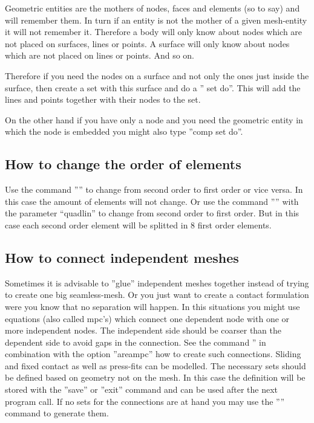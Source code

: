 \documentclass{article}
\begin{document}
\begin{appendix}
Geometric entities are the mothers of nodes, faces and elements (so to say) and will remember them. In turn if an entity is not the mother of a given mesh-entity it will not remember it. Therefore a body will only know about nodes which are not placed on surfaces, lines or points. A surface will only know about nodes which are not placed on lines or points. And so on.

Therefore if you need the nodes on a surface and not only the ones just inside the surface, then create a set with this surface and do a '' set do''. This will add the lines and points together with their nodes to the set.

On the other hand if you have only a node and you need the geometric entity in which the node is embedded you might also type ''comp set do''.


\subsection{\label{How to change the order of elements}How to change the order of elements}
Use the command '''' to change from second order to first order or vice versa. In this case the amount of elements will not change. Or use the command '''' with the parameter ``quadlin'' to change from second order to first order. But in this case each second order element will be splitted in 8 first order elements. 


\subsection{\label{How to connect independent meshes}How to connect independent meshes}
Sometimes it is advisable to ''glue'' independent meshes together instead of trying to create one big seamless-mesh. Or you just want to create a contact formulation were you know that no separation will happen. In this situations you might use equations (also called mpc's) which connect one dependent node with one or more independent nodes. The independent side should be coarser than the dependent side to avoid gaps in the connection. See the command '' in combination with the option ''areampc'' how to create such connections. Sliding and fixed contact as well as press-fits can be modelled. The necessary sets should be defined based on geometry not on the mesh. In this case the definition will be stored with the ''save'' or ''exit'' command and can be used after the next program call. If no sets for the connections are at hand you may use the '''' command to generate them.


\end{appendix}
\end{document}
